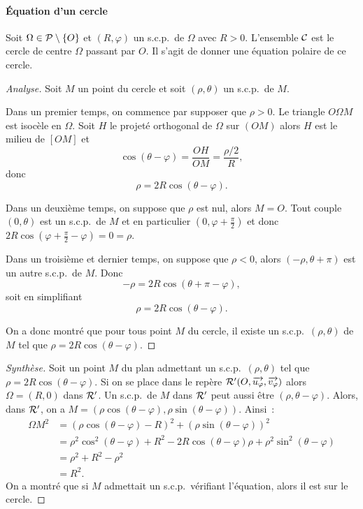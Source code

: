 \paragraph{Équation d'un cercle}
\label{par:eqcercle}
Soit $\Omega \in \P \setminus\{O\}$ et $(R,\varphi)$ un s.c.p.\ de $\Omega$ avec $R>0$. L'ensemble $\courbe$ est le cercle de centre $\Omega$ passant par $O$. Il s'agit de donner une équation polaire de ce cercle.
\begin{proof}[Analyse]
Soit $M$ un point du cercle et soit $(\rho, \theta)$ un s.c.p.\ de $M$. 

Dans un premier temps, on commence par supposer que $\rho >0$. Le triangle $O\Omega M$ est isocèle en $\Omega$. Soit $H$ le projeté orthogonal de $\Omega$ sur $(OM)$ alors $H$ est le milieu de $[OM]$ et
\begin{equation}
 \cos(\theta - \varphi)=\frac{OH}{OM}=\frac{\rho/2}{R}, 
\end{equation}
donc
\begin{equation}  
  \rho=2R \cos(\theta-\varphi). 
\end{equation}

Dans un deuxième temps, on suppose que $\rho$ est nul, alors $M=O$. Tout couple $(0,\theta)$ est un s.c.p.\ de $M$ et en particulier $(0,\varphi+\frac{\pi}{2})$ et donc $2R \cos(\varphi+\frac{\pi}{2} - \varphi)=0=\rho$. 

Dans un troisième et dernier temps, on suppose que $\rho <0$, alors $(-\rho, \theta+\pi)$ est un autre s.c.p.\ de $M$. Donc
\begin{equation}
  -\rho = 2R \cos(\theta+\pi-\varphi),
\end{equation}
soit en simplifiant
\begin{equation}
  \rho=2R\cos(\theta-\varphi).
\end{equation}

On a donc montré que pour tous point $M$ du cercle, il existe un s.c.p.\ $(\rho,\theta)$ de $M$ tel que $\rho=2R\cos(\theta-\varphi)$.
\end{proof}
\begin{proof}[Synthèse]
Soit un point $M$ du plan admettant un s.c.p.\ $(\rho,\theta)$ tel que $\rho=2R\cos(\theta-\varphi)$. Si on se place dans le repère $\Rep' (O,\vect{u_\varphi}, \vect{v_\varphi})$ alors $\Omega =(R,0)$ dans $\Rep'$. Un s.c.p.\ de $M$ dans $\Rep'$ peut aussi être $(\rho,\theta-\varphi)$. Alors, dans $\Rep'$, on a $M=(\rho \cos(\theta-\varphi), \rho \sin(\theta-\varphi))$. Ainsi~:
\begin{align}
  {\Omega M}^2&=(\rho\cos(\theta-\varphi)-R)^2 + (\rho\sin(\theta-\varphi))^2 \\
  &= \rho^2 \cos^2(\theta-\varphi)+R^2 - 2R\cos(\theta-\varphi)\rho + \rho^2 \sin^2(\theta-\varphi) \\
  &= \rho^2 + R^2 - \rho^2\\
  &= R^2.
\end{align}
On a montré que si $M$ admettait un s.c.p.\ vérifiant l'équation, alors il est sur le cercle.
\end{proof}
%
